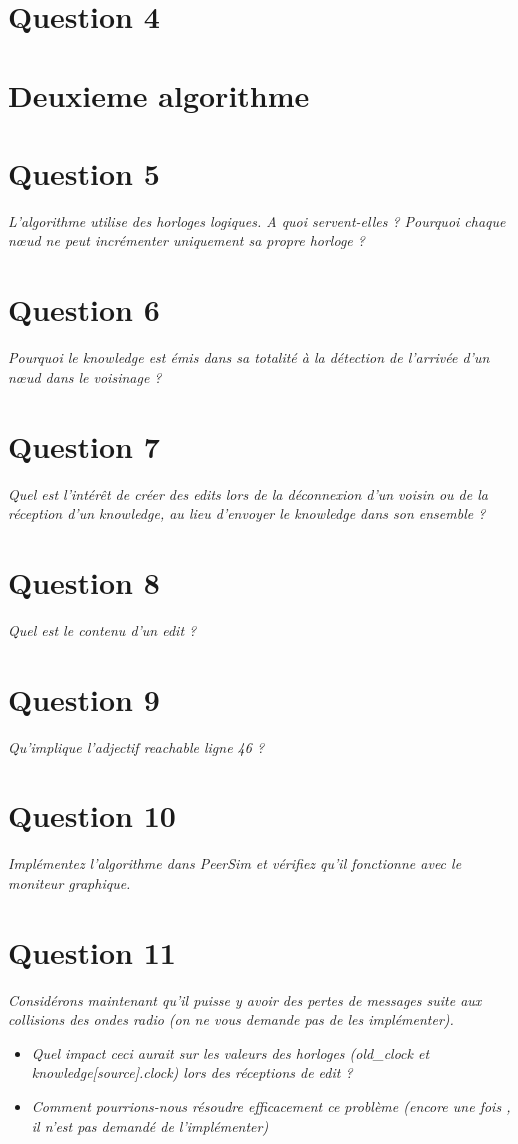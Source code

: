 \documentclass[11pt,a4paper,sans]{report}
\begin{document}
	\section{Question 4}

	\section*{Deuxieme algorithme}

	\section{Question 5}
	\textit{L’algorithme utilise des horloges logiques. A quoi servent-elles ?  Pourquoi chaque nœud ne peut incrémenter uniquement sa propre horloge ?}
	\section{Question 6}
	\textit{Pourquoi le knowledge est émis dans sa totalité à la détection de l’arrivée d’un nœud dans le voisinage ?}
	\section{Question 7}
	\textit{Quel est l’intérêt de créer des edits lors de la déconnexion d’un voisin ou de la réception d’un knowledge, au lieu d’envoyer le knowledge dans son ensemble ?}
	\section{Question 8}
	\textit{Quel est le contenu d’un edit ?}
	\section{Question 9}
	\textit{Qu’implique l’adjectif reachable ligne 46 ?}
	\section{Question 10}
	\textit{Implémentez l’algorithme dans PeerSim et vérifiez qu’il fonctionne avec le moniteur graphique.}
	\section{Question 11}
	\textit{Considérons maintenant qu’il puisse y avoir des pertes de messages suite aux collisions des ondes radio (on ne vous demande pas de les implémenter).}
	\begin{itemize}
		\item \textit{Quel impact ceci aurait sur les valeurs des horloges (old\_clock et knowledge[source].clock) lors des réceptions de edit ?}
		\item \textit{Comment pourrions-nous résoudre efficacement ce problème (encore une fois , il n’est pas demandé de l’implémenter)}
	\end{itemize}
\end{document}

